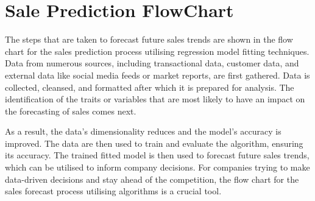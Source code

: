 %
%


\chapter{Sale Prediction FlowChart}

The steps that are taken to forecast future sales trends are shown in the flow chart for the sales prediction process utilising regression model fitting techniques. Data from numerous sources, including transactional data, customer data, and external data like social media feeds or market reports, are first gathered. Data is collected, cleansed, and formatted after which it is prepared for analysis. The identification of the traits or variables that are most likely to have an impact on the forecasting of sales comes next.\bigskip

As a result, the data's dimensionality reduces and the model's accuracy is improved. The data are then used to train and evaluate the algorithm, ensuring its accuracy. The trained fitted model is then used to forecast future sales trends, which can be utilised to inform company decisions. For companies trying to make data-driven decisions and stay ahead of the competition, the flow chart for the sales forecast process utilising algorithms is a crucial tool.

\newpage

